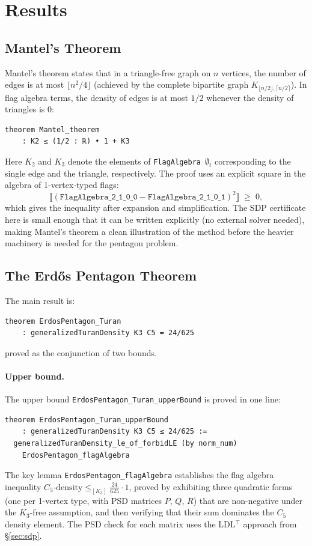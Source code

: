 \documentclass{article}
\newcommand{\lean}[1]{\texttt{#1}}
\begin{document}
\section{Results}
\label{sec:results}

\subsection{Mantel's Theorem}

Mantel's theorem states that in a triangle-free graph on $n$ vertices,
the number of edges is at most $\lfloor n^2/4 \rfloor$ (achieved by
the complete bipartite graph $K_{\lfloor n/2\rfloor, \lceil n/2\rceil}$).
In flag algebra terms, the density of edges is at most $1/2$ whenever the
density of triangles is $0$:

\begin{lstlisting}
theorem Mantel_theorem
    : K2 ≤ (1/2 : ℝ) • 1 + K3
\end{lstlisting}

Here $K_2$ and $K_3$ denote the elements of \lean{FlagAlgebra $\emptyset_t$}
corresponding to the single edge and the triangle, respectively.  The proof uses
an explicit square in the algebra of 1-vertex-typed flags:
\[
  \bigl\llbracket(\lean{FlagAlgebra\_2\_1\_0\_0} - \lean{FlagAlgebra\_2\_1\_0\_1})^2
  \bigr\rrbracket \;\geq\; 0,
\]
which gives the inequality after expansion and simplification.  The SDP
certificate here is small enough that it can be written explicitly (no external
solver needed), making Mantel's theorem a clean illustration of the method
before the heavier machinery is needed for the pentagon problem.

\subsection{The Erd\H{o}s Pentagon Theorem}

The main result is:
\begin{lstlisting}
theorem ErdosPentagon_Turan
    : generalizedTuranDensity K3 C5 = 24/625
\end{lstlisting}
proved as the conjunction of two bounds.

\paragraph{Upper bound.}
The upper bound \lean{ErdosPentagon\_Turan\_upperBound} is proved in one line:
\begin{lstlisting}
theorem ErdosPentagon_Turan_upperBound
    : generalizedTuranDensity K3 C5 ≤ 24/625 :=
  generalizedTuranDensity_le_of_forbidLE (by norm_num)
    ErdosPentagon_flagAlgebra
\end{lstlisting}
The key lemma \lean{ErdosPentagon\_flagAlgebra} establishes the flag algebra
inequality $C_5\text{-density} \leq_{[K_3]} \frac{24}{625} \cdot 1$,
proved by exhibiting three quadratic forms (one per 1-vertex type, with PSD
matrices $P$, $Q$, $R$) that are non-negative under the $K_3$-free assumption,
and then verifying that their sum dominates the $C_5$ density element.  The
PSD check for each matrix uses the LDL$^\top$ approach from \S\ref{sec:sdp}.
\end{document}
